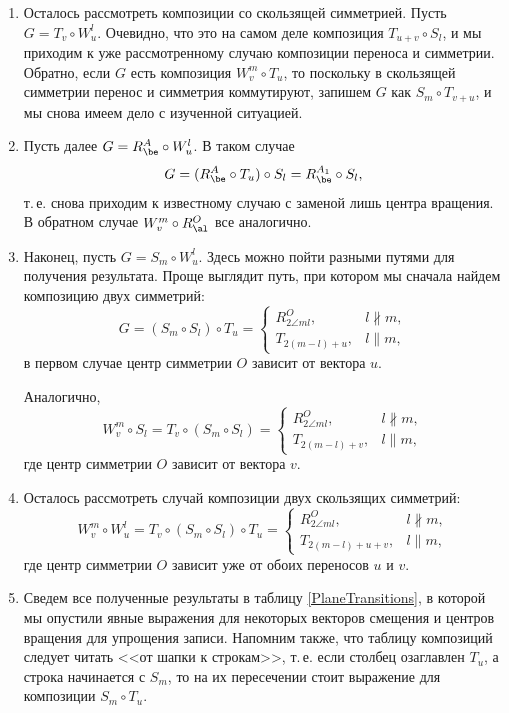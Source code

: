 \begin{enumerate}
\item Осталось рассмотреть композиции со скользящей симметрией. Пусть $G=T_v\circ W_u^l$. Очевидно, что это на самом деле композиция $T_{u+v}\circ S_l$, и мы приходим к уже рассмотренному случаю композиции переноса и симметрии. Обратно, если $G$ есть композиция $W_v^m\circ T_u$, то поскольку в скользящей симметрии перенос и симметрия коммутируют, запишем $G$ как
$S_m\circ T_{v+u}$, и мы снова имеем дело с изученной ситуацией.

\item Пусть далее $G=R_\be^A\circ W_u^l$. В таком случае
$$
G = (R_\be^A\circ T_u)\circ S_l = R_\be^{A_1}\circ S_l,
$$
т.\,е. снова приходим к известному случаю с заменой лишь центра вращения. В обратном случае $W_v^m\circ R_\al^O$ все аналогично.

\item Наконец, пусть $G=S_m\circ W_u^l$. Здесь можно пойти разными путями для получения результата. Проще выглядит путь, при котором мы сначала найдем композицию двух симметрий:
$$
G = (S_m\circ S_l)\circ T_u = \begin{cases} R_{2\angle ml}^O, & l\not\parallel m, \\
T_{2(m-l)+u}, & l\parallel m,\end{cases}
$$
в первом случае центр симметрии $O$ зависит от вектора $u$.

Аналогично,
$$
W_v^m\circ S_l = T_v\circ(S_m\circ S_l) = \begin{cases} R_{2\angle ml}^O, & l\not\parallel m, \\
T_{2(m-l)+v}, & l\parallel m,\end{cases}
$$
где центр симметрии $O$ зависит от вектора $v$.

\item Осталось рассмотреть случай композиции двух скользящих симметрий:
$$
W_v^m\circ W_u^l = T_v\circ(S_m\circ S_l)\circ T_u =\begin{cases} R_{2\angle ml}^O, & l\not\parallel m, \\
T_{2(m-l)+u+v}, & l\parallel m,\end{cases}
$$
где центр симметрии $O$ зависит уже от обоих переносов $u$ и $v$.

\item Сведем все полученные результаты в таблицу  \ref{PlaneTransitions}, в которой мы опустили явные выражения для некоторых векторов смещения и центров вращения для упрощения записи. Напомним также, что таблицу композиций следует читать <<от шапки к строкам>>, т.\,е. если столбец озаглавлен $T_u$, а строка начинается с $S_m$, то на их пересечении стоит выражение для композиции $S_m\circ T_u$.

\end{enumerate}


